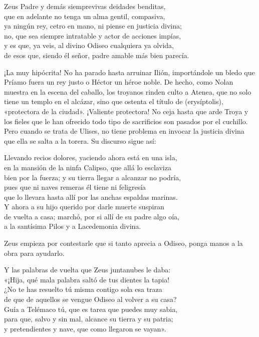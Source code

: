 \begin{versocita}
Zeus Padre y demás siemprevivas deidades benditas,\\
que en adelante no tenga un alma gentil, compasiva,\\
ya ningún rey, cetro en mano, ni piense en justicia divina;\\
no, que sea siempre intratable y actor de acciones impías,\\
y es que, ya veis, al divino Odiseo cualquiera ya olvida,\\
de esos que, siendo él señor, padre amable más bien parecía.
\end{versocita}

¡La muy hipócrita! No ha parado hasta arruinar Ilión, importándole un bledo que Príamo fuera un rey justo o Héctor un héroe noble. De hecho, como Nolan muestra en la escena del caballo, los troyanos rinden culto a Atenea, que no solo tiene un templo en el alcázar, sino que ostenta el título de  (erysíptolis), «protectora de la ciudad». ¡Valiente protectora! No ceja hasta que arde Troya y los fieles que le han ofrecido todo tipo de sacrificios son pasados por el cuchillo. Pero cuando se trata de Ulises, no tiene problema en invocar la justicia divina que ella se salta a la torera. Su discurso sigue así:


\begin{versocita}
Llevando recios dolores, yaciendo ahora está en una isla,\\
en la mansión de la ninfa Calipso, que allá lo esclaviza\\
bien por la fuerza; y su tierra llegar a alcanzar no podría,\\
pues que ni naves remeras él tiene ni feligresía\\
que lo llevara hasta allí por las anchas espaldas marinas.\\
Y ahora a su hijo querido por darle muerte suspiran\\
de vuelta a casa; marchó, por si allí de su padre algo oía,\\
a la santísima Pilos y a Lacedemonia divina.
\end{versocita}


Zeus empieza por contestarle que si tanto aprecia a Odiseo, ponga manos a la obra para ayudarlo.

\begin{versocita}
Y las palabras de vuelta que Zeus juntanubes le daba:\\
«¡Hija, qué mala palabra saltó de tus dientes la tapia!\\
¿No te has resuelto tú misma contigo sola esa traza\\
de que de aquellos se vengue Odiseo al volver a su casa?\\
Guía a Telémaco tú, que es tarea que puedes muy sabia,\\
para que, salvo y sin mal, alcance su tierra y su patria;\\
y pretendientes y nave, que como llegaron se vayan».
\end{versocita}

